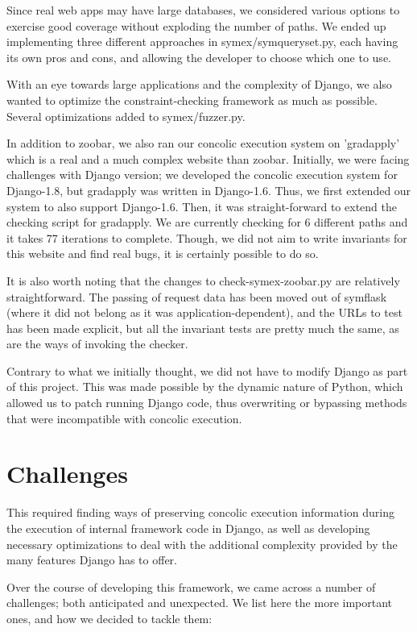 \documentclass{scrartcl}
\begin{document}
Since real web apps may have large databases, we considered various
options to exercise good coverage without exploding the number of
paths. We ended up implementing three different approaches in
symex/symqueryset.py, each having its own pros and cons, and allowing
the developer to choose which one to use.

With an eye towards large applications and the complexity of Django,
we also wanted to optimize the constraint-checking framework as much
as possible. Several optimizations added to symex/fuzzer.py.

In addition to zoobar, we also ran our concolic execution system on
'gradapply' which is a real and a much complex website than zoobar.
Initially, we were facing challenges with Django version; we developed
the concolic execution system for Django-1.8, but gradapply was written
in Django-1.6. Thus, we first extended our system to also support
Django-1.6. Then, it was straight-forward to extend the checking script
for gradapply. We are currently checking for 6 different paths and it takes
77 iterations to complete. Though, we did not aim to write invariants for
this website and find real bugs, it is certainly possible to do so.

It is also
worth noting that the changes to check-symex-zoobar.py are relatively
straightforward. The passing of request data has been moved out of symflask
(where it did not belong as it was application-dependent), and the URLs to test
has been made explicit, but all the invariant tests are pretty much the same,
as are the ways of invoking the checker.

Contrary to what we initially thought, we did not have to modify
Django as part of this project. This was made possible by the dynamic
nature of Python, which allowed us to patch running Django code, thus
overwriting or bypassing methods that were incompatible with concolic
execution.


\section{Challenges}

This required finding ways of preserving concolic execution information during
the execution of internal framework code in Django, as well as developing
necessary optimizations to deal with the additional complexity provided by the
many features Django has to offer.

Over the course of developing this framework, we came across a number of
challenges; both anticipated and unexpected. We list here the more important
ones, and how we decided to tackle them:
\end{document}
